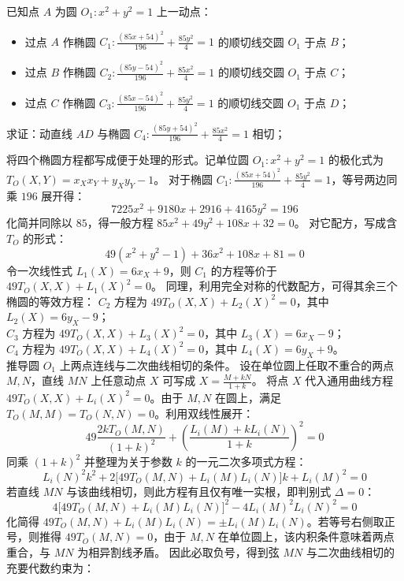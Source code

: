\begin{example}
已知点 \(A\) 为圆 \(O_1: x^2 + y^2 = 1\) 上一动点：
\begin{itemize}
\item 过点 \(A\) 作椭圆 \(C_1: \frac{(85x + 54)^2}{196} + \frac{85y^2}{4} = 1\) 的顺切线交圆 \(O_1\) 于点 \(B\)；
\item 过点 \(B\) 作椭圆 \(C_2: \frac{(85y - 54)^2}{196} + \frac{85x^2}{4} = 1\) 的顺切线交圆 \(O_1\) 于点 \(C\)；
\item 过点 \(C\) 作椭圆 \(C_3: \frac{(85x - 54)^2}{196} + \frac{85y^2}{4} = 1\) 的顺切线交圆 \(O_1\) 于点 \(D\)；
\end{itemize}
求证：动直线 \(AD\) 与椭圆 \(C_4: \frac{(85y + 54)^2}{196} + \frac{85x^2}{4} = 1\) 相切；
\end{example}
\begin{solution}
将四个椭圆方程都写成便于处理的形式。记单位圆 $O_1: x^2 + y^2 = 1$ 的极化式为 $T_O(X,Y) = x_X x_Y + y_X y_Y - 1$。
对于椭圆 $C_1: \frac{(85x + 54)^2}{196} + \frac{85y^2}{4} = 1$，等号两边同乘 $196$ 展开得：
$$ 7225x^2 + 9180x + 2916 + 4165y^2 = 196 $$
化简并同除以 $85$，得一般方程 $85x^2 + 49y^2 + 108x + 32 = 0$。
对它配方，写成含 $T_O$ 的形式：
$$ 49(x^2 + y^2 - 1) + 36x^2 + 108x + 81 = 0 $$
令一次线性式 $L_1(X) = 6x_X + 9$，则 $C_1$ 的方程等价于 $49 T_O(X,X) + L_1(X)^2 = 0$。
同理，利用完全对称的代数配方，可得其余三个椭圆的等效方程：
$C_2$ 方程为 $49 T_O(X,X) + L_2(X)^2 = 0$，其中 $L_2(X) = 6y_X - 9$；\\
$C_3$ 方程为 $49 T_O(X,X) + L_3(X)^2 = 0$，其中 $L_3(X) = 6x_X - 9$；\\
$C_4$ 方程为 $49 T_O(X,X) + L_4(X)^2 = 0$，其中 $L_4(X) = 6y_X + 9$。\\
推导圆 $O_1$ 上两点连线与二次曲线相切的条件。
设在单位圆上任取不重合的两点 $M, N$，直线 $MN$ 上任意动点 $X$ 可写成 $X = \frac{M + k N}{1+k}$。
将点 $X$ 代入通用曲线方程 $49 T_O(X,X) + L_i(X)^2 = 0$。由于 $M, N$ 在圆上，满足 $T_O(M,M) = T_O(N,N) = 0$。利用双线性展开：
$$ 49 \frac{2k T_O(M,N)}{(1+k)^2} + \left( \frac{L_i(M) + k L_i(N)}{1+k} \right)^2 = 0 $$
同乘 $(1+k)^2$ 并整理为关于参数 $k$ 的一元二次多项式方程：
$$ L_i(N)^2 k^2 + 2\big[ 49 T_O(M,N) + L_i(M)L_i(N) \big] k + L_i(M)^2 = 0 $$
若直线 $MN$ 与该曲线相切，则此方程有且仅有唯一实根，即判别式 $\Delta = 0$：
$$ 4\big[ 49 T_O(M,N) + L_i(M)L_i(N) \big]^2 - 4 L_i(M)^2 L_i(N)^2 = 0 $$
化简得 $49 T_O(M,N) + L_i(M)L_i(N) = \pm L_i(M)L_i(N)$。若等号右侧取正号，则推得 $49 T_O(M,N) = 0$，由于 $M, N$ 在单位圆上，该内积条件意味着两点重合，与 $MN$ 为相异割线矛盾。
因此必取负号，得到弦 $MN$ 与二次曲线相切的充要代数约束为：

\end{solution}

